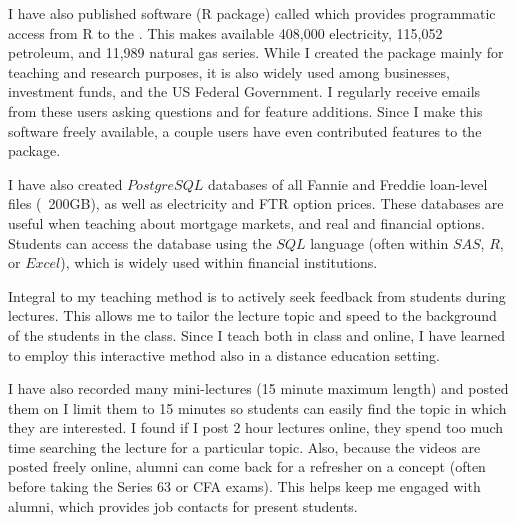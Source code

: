 \documentclass[12pt]{article}
\begin{document}
I have also published software (R package) called \href{https://cran.r-project.org/web/packages/EIAdata/index.html}{\color{Blue}{EIAdata}} which provides programmatic access from R to the \href{http://www.eia.gov/beta/api/index.cfm}{\color{Blue}{EIA's API}}.  This makes available 408,000 electricity, 115,052 petroleum, and 11,989 natural gas series.  While I created the package mainly for teaching and research purposes, it is also widely used among businesses, investment funds, and the US Federal Government.  I regularly receive emails from these users asking questions and for feature additions.  Since I make this software freely available, a couple users have even contributed features to the package.


I have also created $PostgreSQL$ databases of all Fannie and Freddie loan-level files (~200GB), as well as electricity and FTR option prices.  These databases are useful when teaching about mortgage markets, and real and financial options.  Students can access the database using the $SQL$ language (often within $SAS$, $R$, or $Excel$), which is widely used within financial institutions.  

Integral to my teaching method is to actively seek feedback from students during lectures.  This allows me to tailor the lecture topic and speed to the background of the students in the class. Since I teach both in class and online, I have learned to employ this interactive method also in a distance education setting.  

I have also recorded many mini-lectures (15 minute maximum length) and posted them on \href{https://www.youtube.com/channel/UCwekb0vAK-FKaqPF5gfd0eQ}{\color{Blue}{my YouTube channel.}} I limit them to 15 minutes so students can easily find the topic in which they are interested.  I found if I post 2 hour lectures online, they spend too much time searching the lecture for a particular topic.  Also, because the videos are posted freely online, alumni can come back for a refresher on a concept (often before taking the Series 63 or CFA exams).  This helps keep me engaged with alumni, which provides job contacts for present students.  
\end{document}
